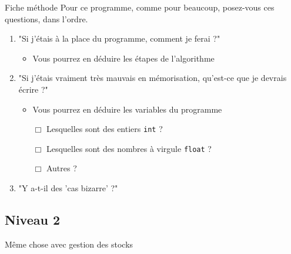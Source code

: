 \begin{UPSTIinfor}{Fiche méthode}
	Pour ce programme, comme pour beaucoup, posez-vous ces questions, dans l'ordre.
	\begin{enumerate}
		\item "Si j'étais à la place du programme, comment je ferai ?"
		      \begin{itemize}
			      \item Vous pourrez en déduire les étapes de l'algorithme
		      \end{itemize}
		\item "Si j'étais vraiment très mauvais en mémorisation, qu'est-ce que je devrais écrire ?"
		      \begin{itemize}
			      \item Vous pourrez en déduire les variables du programme
		      \end{itemize}
		      \begin{itemize}
			      \item[$\Box$] Lesquelles sont des entiers \texttt{int} ?
			      \item[$\Box$] Lesquelles sont des nombres à virgule \texttt{float} ?
			      \item[$\Box$] Autres ?
		      \end{itemize}
		\item "Y a-t-il des 'cas bizarre' ?"
	\end{enumerate}
\end{UPSTIinfor}

\subsection{Niveau 2}
Même chose avec gestion des stocks


